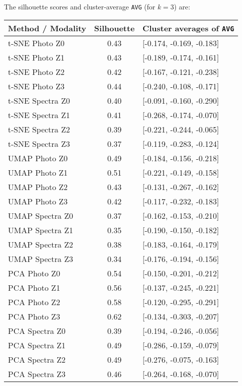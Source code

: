 \documentclass[english,bachelor,oneside]{ctufit-thesis}
\begin{document}
The silhouette scores and cluster‐average \texttt{AVG} (for $k=3$) are:

\begin{center}
\begin{tabular}{l c l}
\toprule
\textbf{Method / Modality} & \textbf{Silhouette} & \textbf{Cluster averages of \texttt{AVG}} \\
\midrule
t-SNE Photo Z0      & 0.43 & [-0.174, -0.169, -0.183] \\
t-SNE Photo Z1      & 0.43 & [-0.189, -0.174, -0.161] \\
t-SNE Photo Z2      & 0.42 & [-0.167, -0.121, -0.238] \\
t-SNE Photo Z3      & 0.44 & [-0.240, -0.108, -0.171] \\
t-SNE Spectra Z0    & 0.40 & [-0.091, -0.160, -0.290] \\
t-SNE Spectra Z1    & 0.41 & [-0.268, -0.174, -0.070] \\
t-SNE Spectra Z2    & 0.39 & [-0.221, -0.244, -0.065] \\
t-SNE Spectra Z3    & 0.37 & [-0.119, -0.283, -0.124] \\
\midrule
UMAP Photo Z0       & 0.49 & [-0.184, -0.156, -0.218] \\
UMAP Photo Z1       & 0.51 & [-0.221, -0.149, -0.158] \\
UMAP Photo Z2       & 0.43 & [-0.131, -0.267, -0.162] \\
UMAP Photo Z3       & 0.42 & [-0.117, -0.232, -0.183] \\
UMAP Spectra Z0     & 0.37 & [-0.162, -0.153, -0.210] \\
UMAP Spectra Z1     & 0.35 & [-0.190, -0.150, -0.182] \\
UMAP Spectra Z2     & 0.38 & [-0.183, -0.164, -0.179] \\
UMAP Spectra Z3     & 0.34 & [-0.176, -0.194, -0.156] \\
\midrule
PCA Photo Z0        & 0.54 & [-0.150, -0.201, -0.212] \\
PCA Photo Z1        & 0.56 & [-0.137, -0.245, -0.221] \\
PCA Photo Z2        & 0.58 & [-0.120, -0.295, -0.291] \\
PCA Photo Z3        & 0.62 & [-0.134, -0.303, -0.207] \\
PCA Spectra Z0      & 0.39 & [-0.194, -0.246, -0.056] \\
PCA Spectra Z1      & 0.49 & [-0.286, -0.159, -0.079] \\
PCA Spectra Z2      & 0.49 & [-0.276, -0.075, -0.163] \\
PCA Spectra Z3      & 0.46 & [-0.264, -0.168, -0.070] \\
\bottomrule
\end{tabular}
\end{center}
\end{document}
